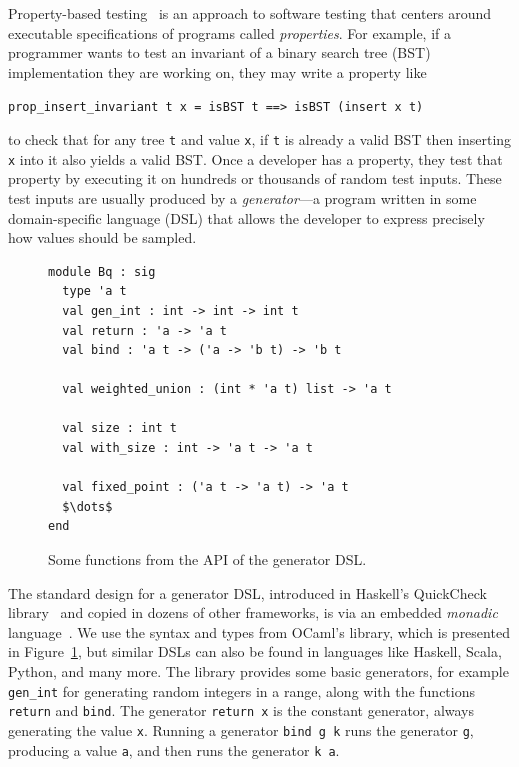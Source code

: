 \documentclass[acmsmall]{acmart}
\theoremstyle{definition}
\begin{document}
Property-based testing~\cite{claessenQuickCheckLightweightTool2000} is an approach to software testing that centers around
executable specifications of programs called {\em properties}. For example, if a
programmer wants to test an invariant of a binary search tree (BST)
implementation they are working on, they may write a property like
\begin{center}
  \texttt{prop\_insert\_invariant t x = isBST t ==> isBST (insert x t)}
\end{center}
to check that for any tree \texttt{t} and value \texttt{x}, if \texttt{t} is
already a valid BST then inserting \texttt{x} into it also yields a valid BST.
Once a developer has a property, they test that property by executing
it on hundreds or thousands of random test inputs. These test inputs are usually
produced by a {\em generator}---a program written in some domain-specific
language (DSL) that allows the developer to express precisely how values should
be sampled.

\begin{figure}[h]
\begin{lstlisting}
module Bq : sig
  type 'a t
  val gen_int : int -> int -> int t
  val return : 'a -> 'a t
  val bind : 'a t -> ('a -> 'b t) -> 'b t

  val weighted_union : (int * 'a t) list -> 'a t

  val size : int t
  val with_size : int -> 'a t -> 'a t

  val fixed_point : ('a t -> 'a t) -> 'a t
  $\dots$
end
\end{lstlisting}
\caption{Some functions from the API of the \bq{} generator DSL.}
\label{fig:bq-api}
\end{figure}

The standard design for a generator DSL, introduced in Haskell's QuickCheck
library~\cite{quickcheck00} and copied in dozens of other frameworks,
is via an embedded {\em monadic} language~\cite{moggi91}. We use the syntax and types from OCaml's \bq library, which is presented in
Figure~\ref{fig:bq-api}, but similar DSLs can also be found in languages
like Haskell, Scala, Python, and many more.
The library provides some basic generators, for
example \texttt{gen\_int} for generating random integers in a range, along with
the functions \texttt{return} and \texttt{bind}.  The
generator \texttt{return x} is the constant generator, always generating the
value \texttt{x}. Running a generator \texttt{bind g k} runs the generator
\texttt{g}, producing a value \texttt{a}, and then runs the generator \texttt{k
a}.
\end{document}
